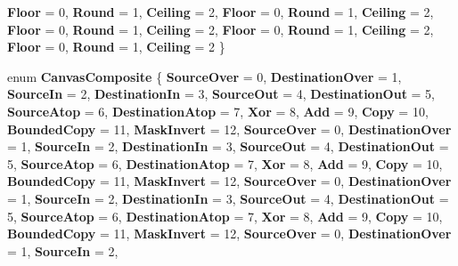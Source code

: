 \begin{DoxyCompactItemize}
{\bfseries Floor} = 0, 
{\bfseries Round} = 1, 
{\bfseries Ceiling} = 2, 
{\bfseries Floor} = 0, 
\newline
{\bfseries Round} = 1, 
{\bfseries Ceiling} = 2, 
{\bfseries Floor} = 0, 
{\bfseries Round} = 1, 
\newline
{\bfseries Ceiling} = 2, 
{\bfseries Floor} = 0, 
{\bfseries Round} = 1, 
{\bfseries Ceiling} = 2, 
\newline
{\bfseries Floor} = 0, 
{\bfseries Round} = 1, 
{\bfseries Ceiling} = 2
 \}
\item 
\mbox{\label{namespace_microsoft_1_1_graphics_1_1_canvas_ad4d6dae38d1a118a5742bdb597529f1e}} 
enum {\bfseries Canvas\+Composite} \{ \newline
{\bfseries Source\+Over} = 0, 
{\bfseries Destination\+Over} = 1, 
{\bfseries Source\+In} = 2, 
{\bfseries Destination\+In} = 3, 
\newline
{\bfseries Source\+Out} = 4, 
{\bfseries Destination\+Out} = 5, 
{\bfseries Source\+Atop} = 6, 
{\bfseries Destination\+Atop} = 7, 
\newline
{\bfseries Xor} = 8, 
{\bfseries Add} = 9, 
{\bfseries Copy} = 10, 
{\bfseries Bounded\+Copy} = 11, 
\newline
{\bfseries Mask\+Invert} = 12, 
{\bfseries Source\+Over} = 0, 
{\bfseries Destination\+Over} = 1, 
{\bfseries Source\+In} = 2, 
\newline
{\bfseries Destination\+In} = 3, 
{\bfseries Source\+Out} = 4, 
{\bfseries Destination\+Out} = 5, 
{\bfseries Source\+Atop} = 6, 
\newline
{\bfseries Destination\+Atop} = 7, 
{\bfseries Xor} = 8, 
{\bfseries Add} = 9, 
{\bfseries Copy} = 10, 
\newline
{\bfseries Bounded\+Copy} = 11, 
{\bfseries Mask\+Invert} = 12, 
{\bfseries Source\+Over} = 0, 
{\bfseries Destination\+Over} = 1, 
\newline
{\bfseries Source\+In} = 2, 
{\bfseries Destination\+In} = 3, 
{\bfseries Source\+Out} = 4, 
{\bfseries Destination\+Out} = 5, 
\newline
{\bfseries Source\+Atop} = 6, 
{\bfseries Destination\+Atop} = 7, 
{\bfseries Xor} = 8, 
{\bfseries Add} = 9, 
\newline
{\bfseries Copy} = 10, 
{\bfseries Bounded\+Copy} = 11, 
{\bfseries Mask\+Invert} = 12, 
{\bfseries Source\+Over} = 0, 
\newline
{\bfseries Destination\+Over} = 1, 
{\bfseries Source\+In} = 2, 

\end{DoxyCompactItemize}
